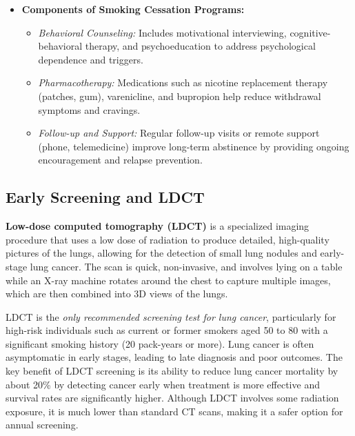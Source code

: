 \begin{itemize}
    \item \textbf{Components of Smoking Cessation Programs:}
        \begin{itemize}
            \item \textit{Behavioral Counseling:} Includes motivational interviewing, cognitive-
            behavioral therapy, and psychoeducation to address psychological dependence and 
            triggers.

            \item \textit{Pharmacotherapy:} Medications such as nicotine replacement therapy 
            (patches, gum), varenicline, and bupropion help reduce withdrawal symptoms and cravings.

            \item \textit{Follow-up and Support:} Regular follow-up visits or remote support 
            (phone, telemedicine) improve long-term abstinence by providing ongoing encouragement 
            and relapse prevention. \cite{Esen2020}
        \end{itemize}
\end{itemize}

\subsection{Early Screening and LDCT}

\textbf{Low-dose computed tomography (LDCT)} is a specialized imaging procedure that uses a low 
dose of radiation to produce detailed, high-quality pictures of the lungs, allowing for the 
detection of small lung nodules and early-stage lung cancer. The scan is quick, non-invasive, and 
involves lying on a table while an X-ray machine rotates around the chest to capture multiple 
images, which are then combined into 3D views of the lungs. 

LDCT is the \textit{only recommended screening test for lung cancer}, particularly for high-risk 
individuals such as current or former smokers aged 50 to 80 with a significant smoking history (20 
pack-years or more). Lung cancer is often asymptomatic in early stages, leading to late diagnosis 
and poor outcomes. The key benefit of LDCT screening is its ability to reduce lung cancer mortality 
by about 20\% by detecting cancer early when treatment is more effective and survival rates are 
significantly higher. Although LDCT involves some radiation exposure, it is much lower than standard 
CT scans, making it a safer option for annual screening. \cite{sl2020}

